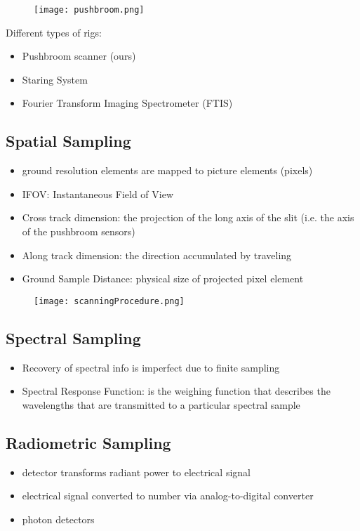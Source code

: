 \begin{figure}[h]
  \texttt{[image: pushbroom.png]}
\end{figure}


Different types of rigs:
\begin{itemize}
  \item Pushbroom scanner (ours)
  \item Staring System
  \item Fourier Transform Imaging Spectrometer (FTIS)
\end{itemize}


\subsection{Spatial Sampling}
\begin{itemize}
  \item ground resolution elements are mapped to picture elements (pixels)
  \item IFOV: Instantaneous Field of View
  \item Cross track dimension: the projection of the long axis of the slit (i.e. the axis of the pushbroom sensors)
  \item Along track dimension: the direction accumulated by traveling
  \item Ground Sample Distance: physical size of projected pixel element
\end{itemize}


\begin{figure}[h]
  \texttt{[image: scanningProcedure.png]}
\end{figure}


\subsection{Spectral Sampling}
\begin{itemize}
  \item Recovery of spectral info is imperfect due to finite sampling
  \item Spectral Response Function: is the weighing function that describes the wavelengths that are transmitted to a particular spectral sample
\end{itemize}

\subsection{Radiometric Sampling}
\begin{itemize}
  \item detector transforms  radiant power to electrical signal
  \item electrical signal converted to number via analog-to-digital converter
  \item photon detectors
\end{itemize}

